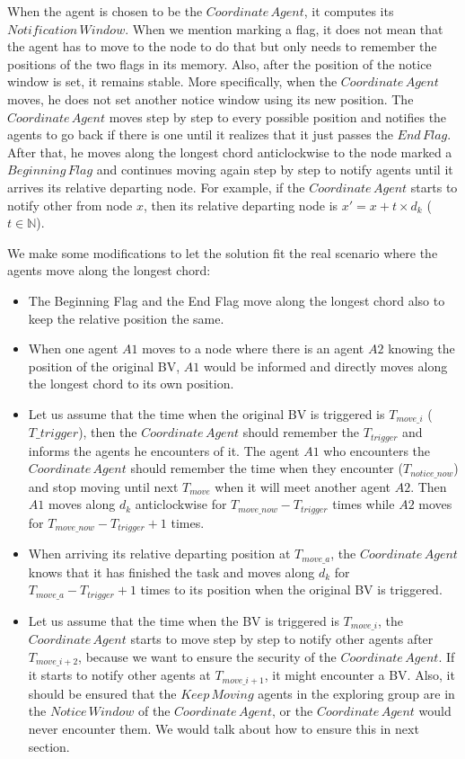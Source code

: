 When the agent is chosen to be the $Coordinate\,Agent$, it computes its $Notification\,Window$. When we mention marking a flag, it does not mean that the agent has to move to the node to do that but only needs to remember the positions of the two flags in its memory. Also, after the position of the notice window is set, it remains stable. More specifically, when the $Coordinate\,Agent$ moves, he does not set another notice window using its new position. The $Coordinate\,Agent$ moves step by step to every possible position and notifies the agents to go back if there is one until it realizes that it just passes the $End\,Flag$. After that, he moves along the longest chord anticlockwise to the node marked a $Beginning\,Flag$ and continues moving again step by step to notify agents until it arrives its relative departing node. For example, if the $Coordinate\,Agent$ starts to notify other from node $x$, then its relative departing node is $x'=x+t\times{d_k}$ ($t\in \mathbb{N}$).

We make some modifications to let the solution fit the real scenario where the agents move along the longest chord: 
\begin{itemize}
\item The Beginning Flag and the End Flag move along the longest chord also to keep the relative position the same. 
\item  When one agent $A1$ moves to a node where there is an agent $A2$ knowing the position of the original BV, $A1$ would be informed and directly moves along the longest chord to its own position. 
\item  Let us assume that the time when the original BV is triggered is $T_{move\_i}$ ($T\_{trigger}$), then the $Coordinate\,Agent$ should remember the $T_{trigger}$ and informs the agents he encounters of it. The agent $A1$ who encounters the $Coordinate\,Agent$ should remember the time when they encounter ($T_{notice\_now}$) and stop moving until next $T_{move}$ when it will meet another agent $A2$. Then $A1$ moves along $d_k$ anticlockwise for $T_{move\_now}-T_{trigger}$ times while $A2$ moves for $T_{move\_now}-T_{trigger}+1$ times. 
\item When arriving its relative departing position at $T_{move\_a}$, the $Coordinate\,Agent$ knows that it has finished the task and moves along $d_k$ for $T_{move\_a}- T_{trigger}+1$ times to its position when the original BV is triggered.
\item Let us assume that the time when the BV is triggered is $T_{move\_i}$, the $Coordinate\,Agent$ starts to move step by step to notify other agents after $T_{move\_{i+2}}$, because we want to ensure the security of the $Coordinate\,Agent$. If it starts to notify other agents at $T_{move\_{i+1}}$, it might encounter a BV. Also, it should be ensured that the $Keep\,Moving$ agents in the exploring group are in the $Notice\,Window$ of the $Coordinate\,Agent$, or the $Coordinate\,Agent$ would never encounter them. We would talk about how to ensure this in next section.
\end{itemize} 

